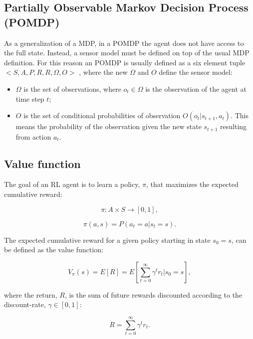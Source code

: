 \subsection{Partially Observable Markov Decision Process (POMDP)}
\noindent As a generalization of a \acrshort{MDP}, in a \acrshort{POMDP} the agent does not have access to the full state. Instead, a sensor model must be defined on top of the usual \acrshort{MDP} definition. For this reason an \acrshort{POMDP} is usually defined as a six element tuple $<S, A, P, R, R, \Omega, O>$ \cite{POMP}, where the new $\Omega$ and $O$ define the sensor model:
\begin{itemize}
    \item $\Omega$ is the set of observations, where $o_t \in \Omega$ is the observation of the agent at time step $t$;
    \item $O$ is the set of conditional probabilities of observation $O(o_{t}|s_{t+1},a_t)$. This means the probability of the observation given the new state $s_{t+1}$ resulting from action $a_t$.
\end{itemize}
\subsection{Value function}
\noindent The goal of an \acrshort{RL} agent is to learn a policy, $\pi$, that maximizes the expected cumulative reward:

\begin{equation}
\pi:A \times S \rightarrow [0, 1],
\end{equation}

\begin{equation} \label{policy_func}
\pi(a, s) = P(a_t=a|s_t=s).
\end{equation}

The expected cumulative reward for a given policy starting in state $s_0=s$, can be defined as the value function:

\begin{equation}\label{Vfunction}
V_{\pi}(s)=E[R]=E[\sum\limits_{t=0}^\infty \gamma^t r_t | s_0 = s],
\end{equation}

where the return, $R$, is the sum of future rewards discounted according to the discount-rate, $\gamma \in [0, 1]$:

\begin{equation} \label{return_func}
R = \sum\limits_{t=0}^\infty \gamma^t r_t .
\end{equation}

